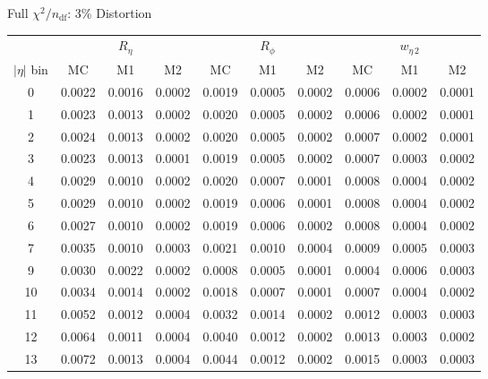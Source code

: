 \documentclass[aspectratio=169,10pt]{beamer}
\begin{document}
\begin{frame}[noframenumbering]{Full $\chi^2/n_\text{df}$: 3\% Distortion}
\centering
\scriptsize
\begin{tabular}{
  c
  c@{\hskip 4pt}c@{\hskip 4pt}c
  c@{\hskip 4pt}c@{\hskip 4pt}c
  c@{\hskip 4pt}c@{\hskip 4pt}c
}
\toprule
& \multicolumn{3}{c}{$R_\eta$}
& \multicolumn{3}{c}{$R_\phi$}
& \multicolumn{3}{c}{$w_{\eta\,2}$} \\
\cmidrule(lr){2-4}\cmidrule(lr){5-7}\cmidrule(lr){8-10}
{$|\eta|$ bin} & {MC} & {M1} & {M2} & {MC} & {M1} & {M2} & {MC} & {M1} & {M2} \\
\midrule
0  & 0.0022 & 0.0016 & 0.0002 & 0.0019 & 0.0005 & 0.0002 & 0.0006 & 0.0002 & 0.0001 \\
1  & 0.0023 & 0.0013 & 0.0002 & 0.0020 & 0.0005 & 0.0002 & 0.0006 & 0.0002 & 0.0001 \\
2  & 0.0024 & 0.0013 & 0.0002 & 0.0020 & 0.0005 & 0.0002 & 0.0007 & 0.0002 & 0.0001 \\
3  & 0.0023 & 0.0013 & 0.0001 & 0.0019 & 0.0005 & 0.0002 & 0.0007 & 0.0003 & 0.0002 \\
4  & 0.0029 & 0.0010 & 0.0002 & 0.0020 & 0.0007 & 0.0001 & 0.0008 & 0.0004 & 0.0002 \\
5  & 0.0029 & 0.0010 & 0.0002 & 0.0019 & 0.0006 & 0.0001 & 0.0008 & 0.0004 & 0.0002 \\
6  & 0.0027 & 0.0010 & 0.0002 & 0.0019 & 0.0006 & 0.0002 & 0.0008 & 0.0004 & 0.0002 \\
7  & 0.0035 & 0.0010 & 0.0003 & 0.0021 & 0.0010 & 0.0004 & 0.0009 & 0.0005 & 0.0003 \\
9  & 0.0030 & 0.0022 & 0.0002 & 0.0008 & 0.0005 & 0.0001 & 0.0004 & 0.0006 & 0.0003 \\
10 & 0.0034 & 0.0014 & 0.0002 & 0.0018 & 0.0007 & 0.0001 & 0.0007 & 0.0004 & 0.0002 \\
11 & 0.0052 & 0.0012 & 0.0004 & 0.0032 & 0.0014 & 0.0002 & 0.0012 & 0.0003 & 0.0003 \\
12 & 0.0064 & 0.0011 & 0.0004 & 0.0040 & 0.0012 & 0.0002 & 0.0013 & 0.0003 & 0.0002 \\
13 & 0.0072 & 0.0013 & 0.0004 & 0.0044 & 0.0012 & 0.0002 & 0.0015 & 0.0003 & 0.0003 \\
\bottomrule
\end{tabular}
\end{frame}
\end{document}
